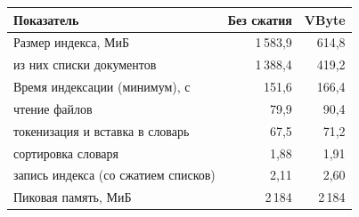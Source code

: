 \begin{tabular}{|p{}|r|r|}
\hline
Показатель & Без сжатия & VByte \\
\hline
Размер индекса, МиБ & 1\,583,9 & 614,8 \\
\hline
\quad из них списки документов & 1\,388,4 & 419,2 \\
\hline
Время индексации (минимум), с & 151,6 & 166,4 \\
\hline
\quad чтение файлов & 79,9 & 90,4 \\
\hline
\quad токенизация и вставка в словарь & 67,5 & 71,2 \\
\hline
\quad сортировка словаря & 1,88 & 1,91 \\
\hline
\quad запись индекса (со сжатием списков) & 2,11 & 2,60 \\
\hline
Пиковая память, МиБ & 2\,184 & 2\,184 \\
\hline
\end{tabular}
